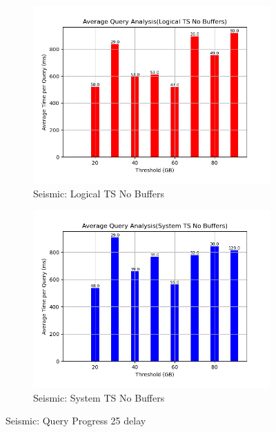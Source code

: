 \begin{figure}
\begin{subfigure}[c]{0.45\textwidth}
	\end{subfigure}
	\begin{subfigure}[c]{0.45\textwidth}
		\includegraphics[width=1\textwidth]	 {figures/Experiments/Dynamic/SEISMIC/batch_answering/25/average_query_time_per_batch_version_999777016_10485760_10_delay[25].png}
		\caption{Seismic: Logical TS No Buffers}
		\label{fig:logical-ts-no-25-seismic}
	\end{subfigure}
	\begin{subfigure}[c]{0.45\textwidth}
		\includegraphics[width=1\textwidth]	 {figures/Experiments/Dynamic/SEISMIC/batch_answering/25/average_query_time_per_batch_version_999777017_10485760_10_delay[25].png}
		\caption{Seismic: System TS No Buffers}
		\label{fig:system-ts-no-25-seismic}
	\end{subfigure}
	\caption{Seismic: Query Progress 25 delay}
	\label{fig:query-progress-25-seismic}
\end{figure}
